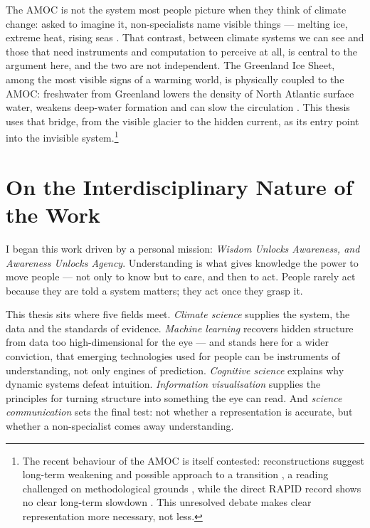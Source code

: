 The AMOC is not the system most people picture when they think of climate change: asked to imagine it, non-specialists name visible things --- melting ice, extreme heat, rising seas \citep{oneill2014}. That contrast, between climate systems we can see and those that need instruments and computation to perceive at all, is central to the argument here, and the two are not independent. The Greenland Ice Sheet, among the most visible signs of a warming world, is physically coupled to the AMOC: freshwater from Greenland lowers the density of North Atlantic surface water, weakens deep-water formation and can slow the circulation \citep{boning2016, caesar2018, rahmstorf2015}. This thesis uses that bridge, from the visible glacier to the hidden current, as its entry point into the invisible system.\footnote{The recent behaviour of the AMOC is itself contested: reconstructions suggest long-term weakening and possible approach to a transition \citep{caesar2018, boers2021, ditlevsen2023}, a reading challenged on methodological grounds \citep{benyami2024}, while the direct RAPID record shows no clear long-term slowdown \citep{moat2026}. This unresolved debate makes clear representation more necessary, not less.}

\section{On the Interdisciplinary Nature of the Work}
\label{sec:positioning}

I began this work driven by a personal mission: \emph{Wisdom Unlocks Awareness, and Awareness Unlocks Agency}. Understanding is what gives knowledge the power to move people --- not only to know but to care, and then to act. People rarely act because they are told a system matters; they act once they grasp it.

This thesis sits where five fields meet. \emph{Climate science} supplies the system, the data and the standards of evidence. \emph{Machine learning} recovers hidden structure from data too high-dimensional for the eye --- and stands here for a wider conviction, that emerging technologies used for people can be instruments of understanding, not only engines of prediction. \emph{Cognitive science} explains why dynamic systems defeat intuition. \emph{Information visualisation} supplies the principles for turning structure into something the eye can read. And \emph{science communication} sets the final test: not whether a representation is accurate, but whether a non-specialist comes away understanding.

